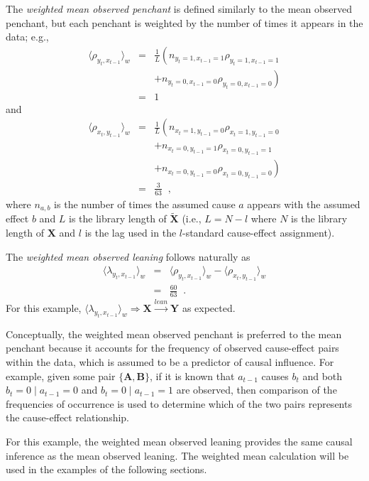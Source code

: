 \documentclass[twocolumn,aps,pre,groupedaddress]{revtex4-1}
\begin{document}
The {\em weighted mean observed penchant} is defined similarly to the mean observed penchant, but each penchant is weighted by the number of times it appears in the data; e.g.,\
\begin{eqnarray*}
\langle \rho_{y_t,x_{t-1}} \rangle_w &=& \frac{1}{L}\left(n_{y_t=1,x_{t-1}=1}\rho_{y_t=1,x_{t-1}=1} \right.\\
& & \left.+ n_{y_t=0,x_{t-1}=0}\rho_{y_t=0,x_{t-1}=0}\right)\\
&=& 1
\end{eqnarray*}
and
\begin{eqnarray*}
\langle \rho_{x_t,y_{t-1}} \rangle_w &=& \frac{1}{L}\left(n_{x_t=1,y_{t-1}=0}\rho_{x_t=1,y_{t-1}=0} \right.\\
& & +n_{x_t=0,y_{t-1}=1}\rho_{x_t=0,y_{t-1}=1}\\
& & \left.+ n_{x_t=0,y_{t-1}=0}\rho_{x_t=0,y_{t-1}=0}\right)\\
&=& \frac{3}{63}\;\;,
\end{eqnarray*}
where $n_{a,b}$ is the number of times the assumed cause $a$ appears with the assumed effect $b$ and $L$ is the library length of $\tilde{\mathbf{X}}$ (i.e., $L=N-l$ where $N$ is the library length of $\mathbf{X}$ and $l$ is the lag used in the $l$-standard cause-effect assignment).  

The {\em weighted mean observed leaning} follows naturally as
\begin{eqnarray*}
\langle \lambda_{y_t,x_{t-1}} \rangle_w &=& \langle \rho_{y_t,x_{t-1}} \rangle_w - \langle \rho_{x_t,y_{t-1}} \rangle_w\\
&=& \frac{60}{63}\;\;.
\end{eqnarray*}
For this example, $\langle \lambda_{y_t,x_{t-1}} \rangle_w\Rightarrow \mathbf{X}\xrightarrow{lean}\mathbf{Y}$ as expected.

Conceptually, the weighted mean observed penchant is preferred to the mean penchant because it accounts for the frequency of observed cause-effect pairs within the data, which is assumed to be a predictor of causal influence.  For example, given some pair $\{\mathbf{A},\mathbf{B}\}$, if it is known that $a_{t-1}$ causes $b_{t}$ and both $b_t = 0\; |\; a_{t-1} = 0$ and $b_t = 0\; |\; a_{t-1} = 1$ are observed, then comparison of the frequencies of occurrence is used to determine which of the two pairs represents the cause-effect relationship.

For this example, the weighted mean observed leaning provides the same causal inference as the mean observed leaning.  The weighted mean calculation will be used in the examples of the following sections.
\end{document}
